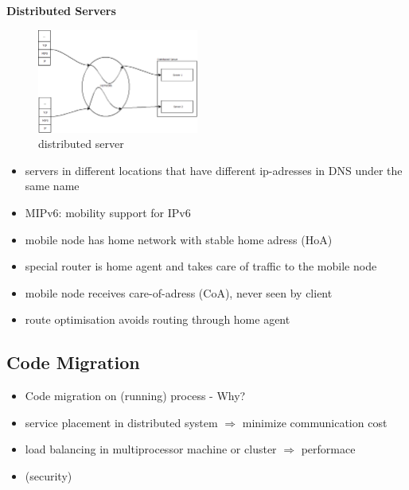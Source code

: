 \documentclass[ngerman,a4paper]{report}
\begin{document}
\textbf{Distributed Servers}\\
\begin{figure}[h]
	\centering
	\includegraphics[width=200px]{gfx/distrb_server.png}
	\caption{distributed server}
	\label{img:distrb_serv}
\end{figure}
\begin{itemize}
	\item servers in different locations that have different ip-adresses in DNS under the same name
	\item MIPv6: mobility support for IPv6
	\item mobile node has home network with stable home adress (HoA)
	\item special router is home agent and takes care of traffic to the mobile node
	\item mobile node receives care-of-adress (CoA), never seen by client
	\item route optimisation avoids routing through home agent
\end{itemize}

\subsection{Code Migration}
\begin{itemize}
	\item Code migration on (running) process - Why?
	\item service placement in distributed system $\Rightarrow$ minimize communication cost
	\item load balancing in multiprocessor machine or cluster $\Rightarrow$ performace
	\item (security)

\end{itemize}
\end{document}
